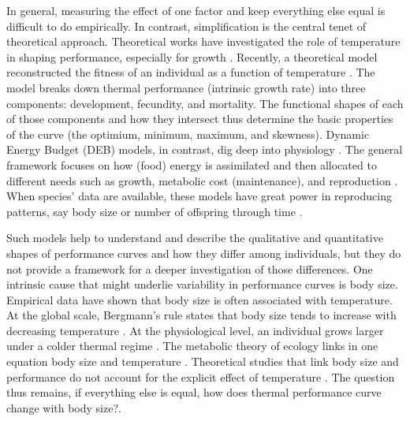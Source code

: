 In general, measuring the effect of one factor and keep everything else equal  is difficult to do empirically.
In contrast, simplification is the central tenet of theoretical approach.
Theoretical works have investigated the role of temperature in shaping performance, especially for growth \citep{VandH1996, Kozlowski2004}.
Recently, a theoretical model reconstructed the fitness of an individual as a function of temperature \citep{Amarasekare2012}.
The model  breaks down thermal performance (intrinsic growth rate)  into three components: development, fecundity, and mortality.
The functional shapes of each of those components and how they intersect thus determine the basic properties of the curve (the optimium, minimum, maximum, and skewness).
Dynamic Energy Budget (DEB) models, in contrast, dig deep into physiology \citep{Kooijman2009}. %
The general framework focuses on how (food) energy is assimilated and then allocated to different needs such as growth, metabolic cost (maintenance), and reproduction \citep{Kooijman2009}.
When species'  data are available, these models have great power in reproducing patterns, say body size or number of offspring through time \citep{Nisbet2000}. 

Such models help to understand and describe the qualitative and quantitative shapes of performance curves and how they differ among individuals, but they do not provide a framework for a deeper investigation of those differences.
One intrinsic cause that might underlie variability in performance curves is body size.
Empirical data have shown that body size is often associated with temperature.  
At the global scale, Bergmann's rule states that body size tends to increase with decreasing temperature \citep{Bergmann1847}.
At the physiological level, an individual grows larger under a colder thermal regime \citep{Van1996}.
The metabolic theory of ecology links in one equation body size and temperature \citep{Gillooly2001}.
Theoretical studies that link body size and performance do not account for the explicit effect of temperature \citep[e.g.,][]{Yodzis1992, Brown1993}.
The question thus remains, if everything else is equal, how does thermal performance curve change with body size?. %


